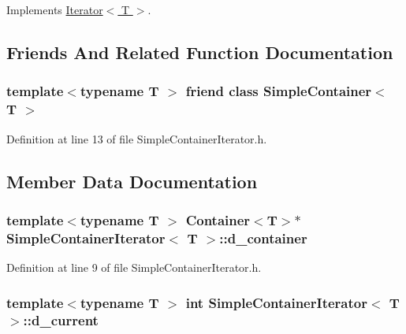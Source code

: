 Implements \hyperlink{class_iterator_a94a7b0c50676cd9ee924eddece41d8d4}{Iterator$<$ T $>$}.



\subsection{Friends And Related Function Documentation}
\hypertarget{class_simple_container_iterator_af3eda3b215741021fb668d573cf344f3}{
\subsubsection[{SimpleContainer$<$ T $>$}]{\setlength{\rightskip}{0pt plus 5cm}template$<$typename T $>$ friend class {\bf SimpleContainer}$<$ T $>$}}
\label{class_simple_container_iterator_af3eda3b215741021fb668d573cf344f3}


Definition at line 13 of file SimpleContainerIterator.h.



\subsection{Member Data Documentation}
\hypertarget{class_simple_container_iterator_a179c3b6ee590cd5476d6dee1c7b9a90e}{
\subsubsection[{d\_\-container}]{\setlength{\rightskip}{0pt plus 5cm}template$<$typename T $>$ {\bf Container}$<$T$>$$\ast$ {\bf SimpleContainerIterator}$<$ T $>$::{\bf d\_\-container}}}
\label{class_simple_container_iterator_a179c3b6ee590cd5476d6dee1c7b9a90e}


Definition at line 9 of file SimpleContainerIterator.h.

\hypertarget{class_simple_container_iterator_a9b59aba2313334330daa03dd2253ddc1}{
\subsubsection[{d\_\-current}]{\setlength{\rightskip}{0pt plus 5cm}template$<$typename T $>$ int {\bf SimpleContainerIterator}$<$ T $>$::{\bf d\_\-current}}}
\label{class_simple_container_iterator_a9b59aba2313334330daa03dd2253ddc1}


